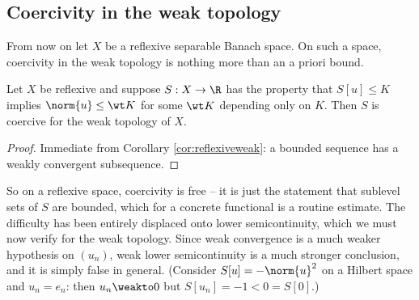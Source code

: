 \begin{center}
\end{center}

\subsection{Coercivity in the weak topology}

From now on let $X$ be a reflexive separable Banach space. On such a space, coercivity in the weak topology is nothing more than an a priori bound.

\begin{lemma}\label{lem:weakcoercive}
	Let $X$ be reflexive and suppose $S : X \to \R$ has the property that $S[u]\le K$ implies $\norm{u}\le \wt K$ for some $\wt K$ depending only on $K$. Then $S$ is coercive for the weak topology of $X$.
\end{lemma}

\begin{proof}
	Immediate from Corollary \ref{cor:reflexiveweak}: a bounded sequence has a weakly convergent subsequence.
\end{proof}

So on a reflexive space, coercivity is free -- it is just the statement that sublevel sets of $S$ are bounded, which for a concrete functional is a routine estimate. The difficulty has been entirely displaced onto lower semicontinuity, which we must now verify for the weak topology. Since weak convergence is a much weaker hypothesis on $(u_n)$, weak lower semicontinuity is a much stronger conclusion, and it is simply false in general. (Consider $S[u] = -\norm{u}^2$ on a Hilbert space and $u_n = e_n$: then $u_n \weakto 0$ but $S[u_n] = -1 < 0 = S[0]$.)

